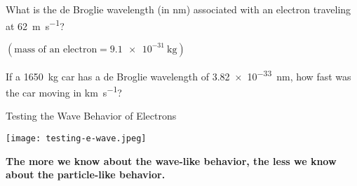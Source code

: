 \documentclass[notes=onlyslideswithnotes,notes=hide]{beamer}
\begin{document}
\begin{inclass}
	What is the de Broglie wavelength (in \si{\nano\meter}) associated with
	an electron traveling at \SI{62}{\meter\per\second}?

	$(\text{mass of an electron} = \SI{9.1e-31}{\kilo\gram})$


\end{inclass}

\begin{onyourown}%
	If a \SI{1650}{\kilo\gram} car has a de Broglie wavelength of
	\SI{3.82e-33}{\nano\meter}, how fast was the car moving in
	\si{\kilo\meter\per\second}?
\end{onyourown}


\begin{frame}{Testing the Wave Behavior of Electrons}
	\begin{center}
		\texttt{[image: testing-e-wave.jpeg]}
	
		\pause
	
		\bfseries{} The more we know about the wave-like behavior, the less we
		know about the particle-like behavior.
	\end{center}
\end{frame}
\end{document}

